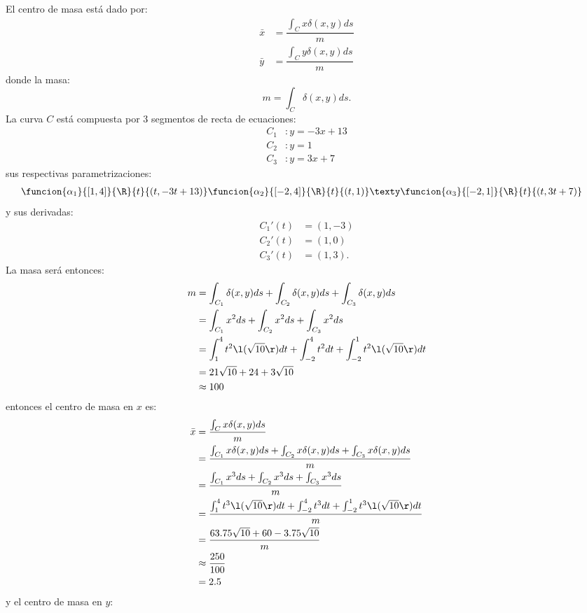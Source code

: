 \documentclass[a4,11pt]{aleph-examen}
\begin{document}
\begin{preguntas}
\begin{respuesta}
\begin{respuesta}
\begin{respuesta}
\begin{enumerate}
\begin{respuesta}
    El centro de masa está dado por:
	\[
    \begin{aligned}
     \bar{x}&=\dfrac{\int_C x \delta(x,y) ds}{m}\\
     \bar{y}&=\dfrac{\int_C y \delta(x,y) ds}{m}
    \end{aligned}
    \]
    donde la masa:
	\[
     m=\int_C \delta(x,y) ds.
    \]
    La curva $C$ está compuesta por 3 segmentos de recta de ecuaciones:
	\[
    \begin{aligned}
     C_1&: y=-3x+13\\
     C_2&: y=1\\
     C_3&: y=3x+7
    \end{aligned}
    \]
    sus respectivas parametrizaciones:
 	\[
    \begin{aligned}
    \funcion{\alpha_1}{[1,4]}{\R}{t}{(t,-3t+13)}&
    \funcion{\alpha_2}{[-2,4]}{\R}{t}{(t,1)} \texty
    \funcion{\alpha_3}{[-2,1]}{\R}{t}{(t,3t+7)} 
    \end{aligned}
    \]
    y sus derivadas:
 	\[
    \begin{aligned}
     C_1'(t)&=(1,-3)\\
     C_2'(t)&=(1,0)\\
     C_3'(t)&=(1,3).
    \end{aligned}
    \]
    La masa será entonces:
     \[
     \begin{aligned}
     m&=\int_{C_1} \delta(x,y) ds+\int_{C_2} \delta(x,y) ds+\int_{C_3} \delta(x,y) ds\\
      &=\int_{C_1} x^2 ds+\int_{C_2} x^2 ds+\int_{C_3} x^2 ds\\
      &=\int_{1}^{4} t^2\l(\sqrt{10}\r) dt+\int_{-2}^{4} t^2 dt+\int_{-2}^{1} t^2\l(\sqrt{10}\r) dt\\
      &=21\sqrt{10}+24+3\sqrt{10}\\
      &\approx 100
     \end{aligned}
    \]
    entonces el centro de masa en $x$ es: 
	\[
    \begin{aligned}
     \bar{x}&=\dfrac{\int_C x \delta(x,y) ds}{m}\\
     &=\dfrac{\int_{C_1} x \delta(x,y) ds+\int_{C_2} x \delta(x,y) ds+\int_{C_3} x \delta(x,y) ds}{m}\\
     &=\dfrac{\int_{C_1} x^3 ds+\int_{C_2} x^3 ds+\int_{C_3} x^3 ds}{m}
     \\
     &=\dfrac{\int_{1}^{4} t^3 \l(\sqrt{10}\r) dt+\int_{-2}^{4} t^3 dt+\int_{-2}^{1} t^3 \l(\sqrt{10}\r) dt}{m}\\
     &=\dfrac{63.75\sqrt{10}+60-3.75\sqrt{10}}{m}\\
     &\approx \dfrac{250}{100}\\
     &=2.5
    \end{aligned}
    \]
    y el centro de masa en $y$:
 

\end{respuesta}
\end{enumerate}
\end{respuesta}
\end{respuesta}
\end{respuesta}
\end{preguntas}
\end{document}
